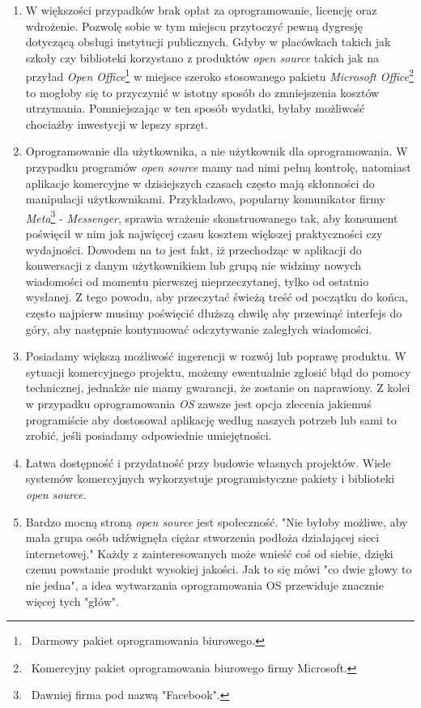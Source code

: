 \documentclass{article}
\begin{document}
\begin{enumerate}
    \item W większości przypadków brak opłat za oprogramowanie, licencję oraz wdrożenie. Pozwolę sobie w tym miejscu przytoczyć pewną dygresję dotyczącą obsługi instytucji publicznych. Gdyby w placówkach takich jak szkoły czy biblioteki korzystano z produktów \emph{open source} takich jak na przyład \emph{Open Office}\footnote{\, Darmowy pakiet oprogramowania biurowego.} w miejsce szeroko stosowanego pakietu \emph{Microsoft Office}\footnote{\, Komercyjny pakiet oprogramowania biurowego firmy Microsoft.} to mogłoby się to przyczynić w istotny sposób do zmniejszenia kosztów utrzymania. Pomniejszając w ten sposób wydatki, byłaby możliwość chociażby inwestycji w lepszy sprzęt.
    
    \item Oprogramowanie dla użytkownika, a nie użytkownik dla oprogramowania. W przypadku programów \emph{open source} mamy nad nimi pełną kontrolę, natomiast aplikacje komercyjne w dzisiejszych czasach często mają skłonności do manipulacji użytkownikami. Przykładowo, popularny komunikator firmy \emph{Meta}\footnote{\, Dawniej firma pod nazwą "Facebook".} - \emph{Messenger}, sprawia wrażenie skonstruowanego tak, aby konsument poświęcił w nim jak najwięcej czasu kosztem większej praktyczności czy wydajności. Dowodem na to jest fakt, iż przechodząc w aplikacji do konwersacji z danym użytkownikiem lub grupą nie widzimy nowych wiadomości od momentu pierwszej nieprzeczytanej, tylko od ostatnio wysłanej. Z tego powodu, aby przeczytać świeżą treść od początku do końca, często najpierw musimy poświęcić dłuższą chwilę aby przewinąć interfejs do góry, aby następnie kontynuować odczytywanie zaległych wiadomości.
    
    \item Posiadamy większą możliwość ingerencji w rozwój lub poprawę produktu. W sytuacji komercyjnego projektu, możemy ewentualnie zgłosić błąd do pomocy technicznej, jednakże nie mamy gwarancji, że zostanie on naprawiony. Z kolei w przypadku oprogramowania \emph{OS} zawsze jest opcja zlecenia jakiemuś programiście aby dostosował aplikację według naszych potrzeb lub sami to zrobić, jeśli posiadamy odpowiednie umiejętności.
    
    \item Łatwa dostępność i przydatność przy budowie własnych projektów. Wiele systemów komercyjnych wykorzystuje programistyczne pakiety i biblioteki \emph{open source}.
    
    \item Bardzo mocną stroną \emph{open source} jest społeczność. "Nie byłoby możliwe, aby mała grupa osób udźwignęła ciężar stworzenia podłoża działającej sieci internetowej\cite{Kotula}." Każdy z zainteresowanych może wnieść coś od siebie, dzięki czemu powstanie produkt wysokiej jakości. Jak to się mówi "co dwie głowy to nie jedna", a idea wytwarzania oprogramowania OS przewiduje znacznie więcej tych "głów".
    

\end{enumerate}
\end{document}
